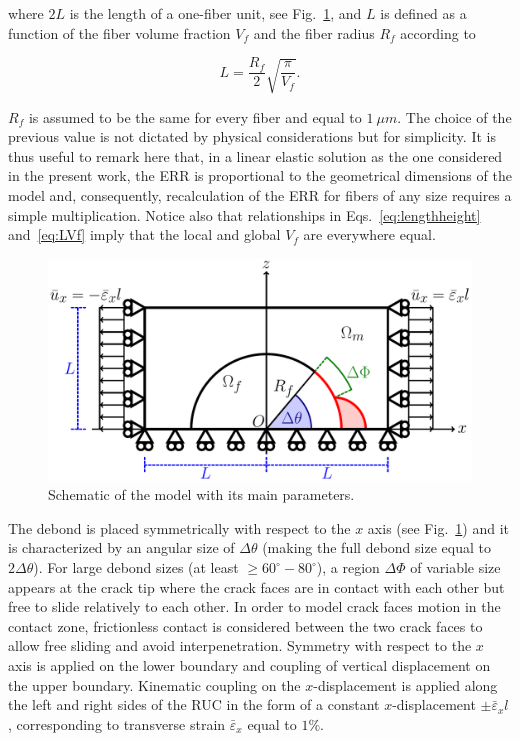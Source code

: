 \documentclass[review]{elsarticle}
\begin{document}
where $2L$ is the length of a one-fiber unit, see Fig.~\ref{fig:modelschem}, and $L$ is defined as a function of the fiber volume fraction $V_{f}$ and the fiber radius $R_{f}$ according to

\begin{equation}\label{eq:LVf}
L=\frac{R_{f}}{2}\sqrt{\frac{\pi}{V_{f}}}.
\end{equation}

$R_{f}$ is assumed to be the same for every fiber and equal to $1\ \mu m$. The choice of the previous value is not dictated by physical considerations but for simplicity. It is thus useful to remark here that, in a linear elastic solution as the one considered in the present work, the ERR is proportional to the geometrical dimensions of the model and, consequently, recalculation of the ERR for fibers of any size requires a simple multiplication. Notice also that relationships in Eqs.~\ref{eq:lengthheight} and~\ref{eq:LVf} imply that the local and global $V_{f}$ are everywhere equal.

\begin{figure}[!h]
\centering
\includegraphics[width=\textwidth]{RUC.pdf}
\caption{Schematic of the model with its main parameters.}\label{fig:modelschem}
\end{figure}

The debond is placed symmetrically with respect to the $x$ axis (see Fig.~\ref{fig:modelschem}) and it is characterized by an angular size of $\Delta\theta$ (making the full debond size equal to $2\Delta\theta$). For large debond sizes (at least $\geq 60^{\circ}-80^{\circ}$), a region $\Delta\Phi$ of variable size appears at the crack tip where the crack faces are in contact with each other but free to slide relatively to each other. In order to model crack faces motion in the contact zone, frictionless contact is considered between the two crack faces to allow free sliding and avoid interpenetration. Symmetry with respect to the $x$ axis is applied on the lower boundary and coupling of vertical displacement on the upper boundary. Kinematic coupling on the $x$-displacement is applied along the left and right sides of the RUC in the form of a constant $x$-displacement $\pm\bar{\varepsilon}_{x} l$, corresponding to transverse strain $\bar{\varepsilon}_{x}$ equal to $1\%$.
\end{document}
